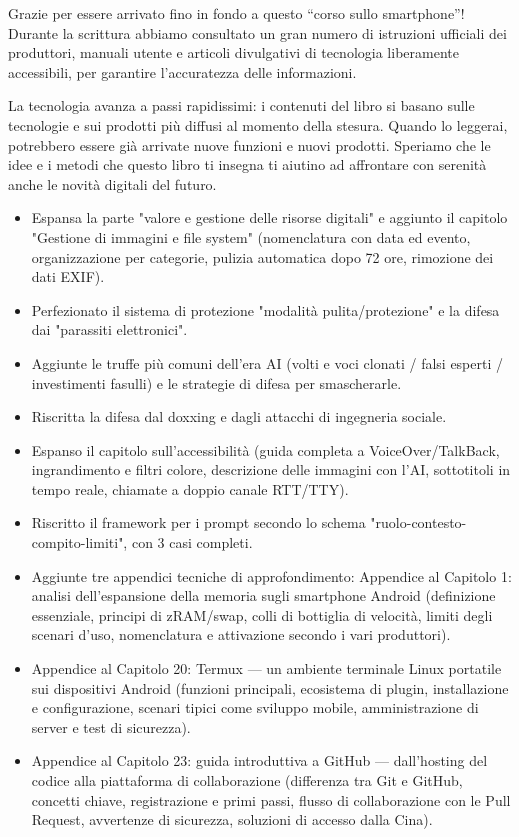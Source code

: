 
Grazie per essere arrivato fino in fondo a questo “corso sullo smartphone”! Durante la scrittura abbiamo consultato un gran numero di istruzioni ufficiali dei produttori, manuali utente e articoli divulgativi di tecnologia liberamente accessibili, per garantire l'accuratezza delle informazioni.

La tecnologia avanza a passi rapidissimi: i contenuti del libro si basano sulle tecnologie e sui prodotti più diffusi al momento della stesura. Quando lo leggerai, potrebbero essere già arrivate nuove funzioni e nuovi prodotti. Speriamo che le idee e i metodi che questo libro ti insegna ti aiutino ad affrontare con serenità anche le novità digitali del futuro.


\begin{itemize}
  \item Espansa la parte "valore e gestione delle risorse digitali" e aggiunto il capitolo "Gestione di immagini e file system" (nomenclatura con data ed evento, organizzazione per categorie, pulizia automatica dopo 72 ore, rimozione dei dati EXIF).
  \item Perfezionato il sistema di protezione "modalità pulita/protezione" e la difesa dai "parassiti elettronici".
  \item Aggiunte le truffe più comuni dell'era AI (volti e voci clonati / falsi esperti / investimenti fasulli) e le strategie di difesa per smascherarle.
  \item Riscritta la difesa dal doxxing e dagli attacchi di ingegneria sociale.
  \item Espanso il capitolo sull'accessibilità (guida completa a VoiceOver/TalkBack, ingrandimento e filtri colore, descrizione delle immagini con l'AI, sottotitoli in tempo reale, chiamate a doppio canale RTT/TTY).
  \item Riscritto il framework per i prompt secondo lo schema "ruolo-contesto-compito-limiti", con 3 casi completi.
  \item Aggiunte tre appendici tecniche di approfondimento: Appendice al Capitolo 1: analisi dell'espansione della memoria sugli smartphone Android (definizione essenziale, principi di zRAM/swap, colli di bottiglia di velocità, limiti degli scenari d'uso, nomenclatura e attivazione secondo i vari produttori).
  \item Appendice al Capitolo 20: Termux — un ambiente terminale Linux portatile sui dispositivi Android (funzioni principali, ecosistema di plugin, installazione e configurazione, scenari tipici come sviluppo mobile, amministrazione di server e test di sicurezza).
  \item Appendice al Capitolo 23: guida introduttiva a GitHub — dall'hosting del codice alla piattaforma di collaborazione (differenza tra Git e GitHub, concetti chiave, registrazione e primi passi, flusso di collaborazione con le Pull Request, avvertenze di sicurezza, soluzioni di accesso dalla Cina).
\end{itemize}

